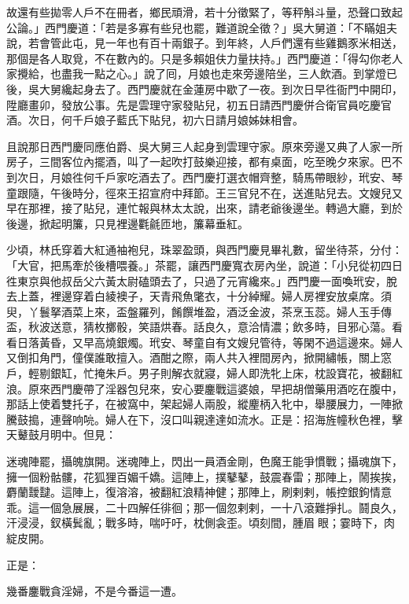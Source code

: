 故還有些拋零人戶不在冊者，鄉民頑滑，若十分徵緊了，等秤斛斗量，恐聲口致起公論。」西門慶道：「若是多寡有些兒也罷，難道說全徵？」吳大舅道：「不瞞姐夫說，若會管此屯，見一年也有百十兩銀子。到年終，人戶們還有些雞鵝豕米相送，那個是各人取覓，不在數內的。只是多賴姐伕力量扶持。」西門慶道：「得勾你老人家攪給，也盡我一點之心。」說了囘，月娘也走來旁邊陪坐，三人飲酒。到掌燈已後，吳大舅纔起身去了。西門慶就在金蓮房中歇了一夜。到次日早徃衙門中開印，陞廳畫卯，發放公事。先是雲理守家發貼兒，初五日請西門慶併合衛官員吃慶官酒。次日，何千戶娘子藍氏下貼兒，初六日請月娘姊妹相會。

且說那日西門慶同應伯爵、吳大舅三人起身到雲理守家。原來旁邊又典了人家一所房子，三間客位內擺酒，叫了一起吹打鼓樂迎接，都有桌面，吃至晚夕來家。巴不到次日，月娘徃何千戶家吃酒去了。西門慶打選衣帽齊整，騎馬帶眼紗，玳安、琴童跟隨，午後時分，徑來王招宣府中拜節。王三官兒不在，送進貼兒去。文嫂兒又早在那裡，接了貼兒，連忙報與林太太說，出來，請老爺後邊坐。轉過大廳，到於後邊，掀起明簾，只見裡邊氍毹匝地，簾幕垂紅。

少頃，林氏穿着大紅通袖袍兒，珠翠盈頭，與西門慶見畢礼數，留坐待茶，分付：「大官，把馬牽於後槽喂養。」茶罷，讓西門慶寬衣房內坐，說道：「小兒從初四日徃東京與他叔岳父六黃太尉磕頭去了，只過了元宵纔來。」西門慶一面喚玳安，脫去上蓋，裡邊穿着白綾襖子，天青飛魚氅衣，十分綽耀。婦人房裡安放桌席。須臾，丫鬟拏酒菜上來，盃盤羅列，餚饌堆盈，酒泛金波，茶烹玉蕊。婦人玉手傳盃，秋波送意，猜枚擲骰，笑語烘春。話良久，意洽情濃；飲多時，目邪心蕩。看看日落黃昏，又早高燒銀燭。玳安、琴童自有文嫂兒管待，等閑不過這邊來。婦人又倒扣角門，僮僕誰敢擅入。酒酣之際，兩人共入裡間房內，掀開繡帳，關上窓戶，輕剔銀缸，忙掩朱戶。男子則解衣就寢，婦人即洗牝上床，枕設寶花，被翻紅浪。原來西門慶帶了淫器包兒來，安心要鏖戰這婆娘，早把胡僧藥用酒吃在腹中，那話上使着雙托子，在被窩中，架起婦人兩股，縱麈柄入牝中，舉腰展力，一陣掀騰鼓搗，連聲响喨。婦人在下，沒口叫親達達如流水。正是：招海旌幢秋色裡，擊天鼙鼓月明中。但見：

\begin{myquote}
迷魂陣罷，攝魄旗開。迷魂陣上，閃出一員酒金剛，色魔王能爭慣戰；攝魂旗下，擁一個粉骷髏，花狐狸百媚千嬌。這陣上，撲鼕鼕，鼓震春雷；那陣上，鬧挨挨，麝蘭靉靆。這陣上，復溶溶，被翻紅浪精神健；那陣上，刷剌剌，帳控銀鉤情意乖。這一個急展展，二十四解任徘徊；那一個忽剌剌，一十八滾難掙扎。鬪良久，汗浸浸，釵橫鬂亂；戰多時，喘吁吁，枕側衾歪。頃刻間，腫眉𦣘眼；霎時下，肉綻皮開。
\end{myquote}

正是：

\begin{myquote}
幾番鏖戰貪淫婦，不是今番這一遭。
\end{myquote}

